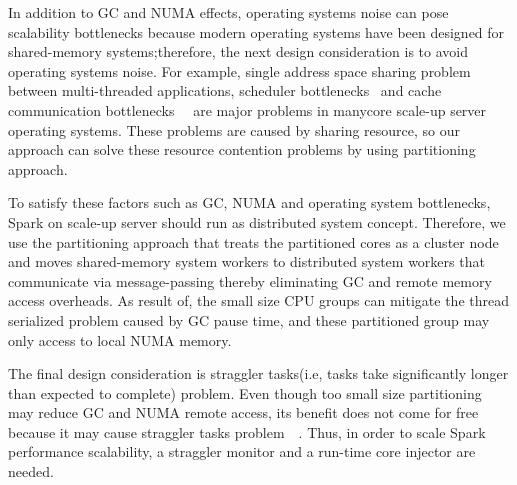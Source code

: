In addition to GC and NUMA effects, operating systems noise can pose scalability
bottlenecks because modern operating systems have been designed for shared-memory
systems;therefore, the next design consideration is to avoid operating systems noise.
For example, single address space sharing problem~\cite{AustinTClements2012RCUBalancedTrees}~\cite{Clements2013RadixVM} between multi-threaded
applications, scheduler bottlenecks~\cite{Lozi2016LSD} and cache
communication bottlenecks~\cite{SilasBoydWickizerPth}~\cite{Hendler2010FC} are major problems in manycore scale-up server
operating systems.
These problems are caused by sharing resource, so our approach can solve these
resource contention problems by using partitioning approach.

To satisfy these factors such as GC, NUMA and operating system
bottlenecks, Spark on scale-up server should run
as distributed system concept.
Therefore, we use the partitioning approach that treats the partitioned cores as a cluster
node and moves shared-memory system workers to distributed system workers that communicate
via message-passing thereby eliminating GC and remote memory access overheads.
As result of, the small size CPU groups can mitigate the thread
serialized problem caused by GC pause time, and these partitioned group may only access to local NUMA memory.

\ifkor
The final design consideration is straggler tasks(i.e, tasks take
significantly longer than expected to complete) problem.
Even though too small size partitioning may reduce GC and NUMA remote access, its benefit
does not come for free because it may cause straggler tasks
problem~\cite{Ousterhout2015MSP}~\cite{Ren2015HDS}.
Thus, in order to scale Spark performance scalability, a straggler monitor and a
run-time core injector are needed.
\else

